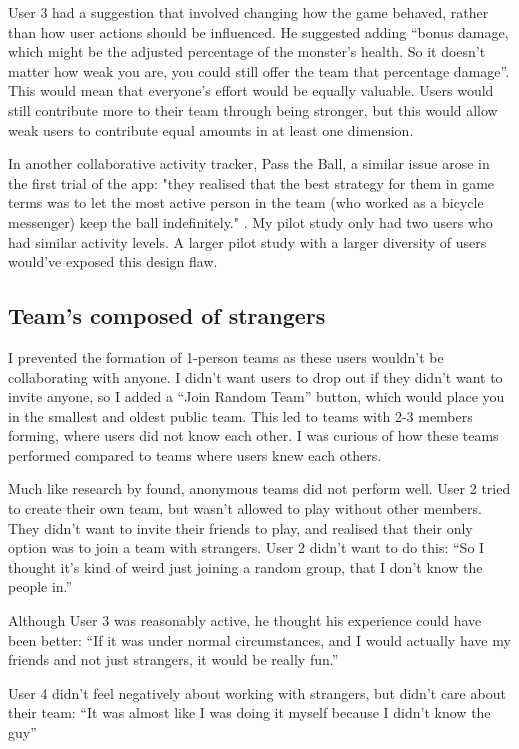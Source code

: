 \documentclass{l4proj}
\begin{document}
User 3 had a suggestion that involved changing how the game behaved, rather than how user actions should be influenced. He suggested adding ``bonus damage, which might be the adjusted percentage of the monster's health. So it doesn't matter how weak you are, you could still offer the team that percentage damage''. This would mean that everyone's effort would be equally valuable. Users would still contribute more to their team through being stronger, but this would allow weak users to contribute equal amounts in at least one dimension. 

In another collaborative activity tracker, Pass the Ball, a similar issue arose in the first trial of the app: "they realised that the best strategy for them in game terms was to let the most active person in the team (who worked as a bicycle messenger) keep the ball indefinitely." \citep{Pass_the_ball}. My pilot study only had two users who had similar activity levels. A larger pilot study with a larger diversity of users would've exposed this design flaw.

\subsection{Team's composed of strangers}
I prevented the formation of 1-person teams as these users wouldn't be collaborating with anyone. I didn't want users to drop out if they didn't want to invite anyone, so I added a ``Join Random Team'' button, which would place you in the smallest and oldest public team. This led to teams with 2-3 members forming, where users did not know each other. I was curious of how these teams performed compared to teams where users knew each others.

Much like research by \citet{Fish'n'Steps} found, anonymous teams did not perform well. User 2 tried to create their own team, but wasn't allowed to play without other members. They didn't want to invite their friends to play, and realised that their only option was to join a team with strangers. User 2 didn't want to do this: ``So I thought it's kind of weird just joining a random group, that I don't know the people in.'' 

Although User 3 was reasonably active, he thought his experience could have been better: ``If it was under normal circumstances, and I would actually have my friends and not just strangers, it would be really fun.'' 

User 4 didn't feel negatively about working with strangers, but didn't care about their team: ``It was almost like I was doing it myself because I didn't know the guy'' 
\end{document}
